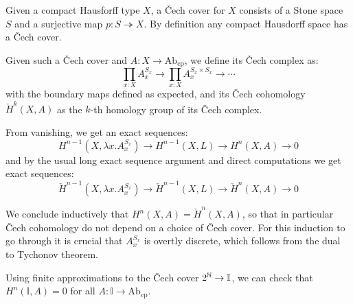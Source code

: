 \documentclass{../util/zariski}
\begin{document}
Given a compact Hausforff type $X$, a \v{C}ech cover for $X$ consists of a Stone space $S$ and a surjective map $p:S\twoheadrightarrow X$. By definition any compact Hausdorff space has a \v{C}ech cover.

Given such a \v{C}ech cover and $A:X\to \mathrm{Ab}_{\mathrm{cp}}$, we define its \v{C}ech complex as:
\[\prod_{x:X}A_x^{S_x} \to \prod_{x:X}A_x^{S_x\times S_x} \to \cdots\]
with the boundary maps defined as expected, and its \v{C}ech cohomology $\check{H}^k(X,A)$ as the $k$-th homology group of its \v{C}ech complex.

From vanishing, we get an exact sequences:
\[H^{n-1}(X,\lambda x.A_x^{S_x}) \to H^{n-1}(X,L)\to H^n(X,A)\to 0\]
and by the usual long exact sequence argument and direct computations we get exact sequences:
\[\check{H}^{n-1}(X,\lambda x.A_x^{S_x}) \to \check{H}^{n-1}(X,L)\to \check{H}^n(X,A)\to 0\]

We conclude inductively that $H^n(X,A) = \check{H}^n(X,A)$, so that in particular \v{C}ech cohomology do not depend on a choice of \v{C}ech cover. For this induction to go through it is crucial that $A_x^{S_x}$ is overtly discrete, which follows from the dual to Tychonov theorem.

Using finite approximations to the \v{C}ech cover $2^{\mathbb{N}}\to \mathbb{I}$, we can check that $H^n(\mathbb{I},A) = 0$ for all $A:\mathbb{I}\to \mathrm{Ab}_{\mathrm{cp}}$.

\printbibliography
\end{document}
